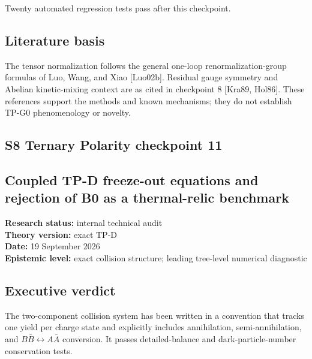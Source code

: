\documentclass[
]{article}
\begin{document}
Twenty automated regression tests pass after this checkpoint.

\hypertarget{literature-basis}{%
\subsection{Literature basis}\label{literature-basis}}

The tensor normalization follows the general one-loop
renormalization-group formulas of Luo, Wang, and Xiao {[}Luo02b{]}.
Residual gauge symmetry and Abelian kinetic-mixing context are as cited
in checkpoint 8 {[}Kra89, Hol86{]}. These references support the methods
and known mechanisms; they do not establish TP-G0 phenomenology or
novelty.

\newpage

\hypertarget{s8-ternary-polarity-checkpoint-11}{%
\subsection{S8 Ternary Polarity checkpoint
11}\label{s8-ternary-polarity-checkpoint-11}}

\hypertarget{coupled-tp-d-freeze-out-equations-and-rejection-of-b0-as-a-thermal-relic-benchmark}{%
\subsection{Coupled TP-D freeze-out equations and rejection of B0 as a
thermal-relic
benchmark}\label{coupled-tp-d-freeze-out-equations-and-rejection-of-b0-as-a-thermal-relic-benchmark}}

\textbf{Research status:} internal technical audit\\
\textbf{Theory version:} exact TP-D\\
\textbf{Date:} 19 September 2026\\
\textbf{Epistemic level:} exact collision structure; leading tree-level
numerical diagnostic

\hypertarget{executive-verdict-5}{%
\subsection{Executive verdict}\label{executive-verdict-5}}

The two-component collision system has been written in a convention that
tracks one yield per charge state and explicitly includes annihilation,
semi-annihilation, and \(B\bar B\leftrightarrow A\bar A\) conversion. It
passes detailed-balance and dark-particle-number conservation tests.
\end{document}
